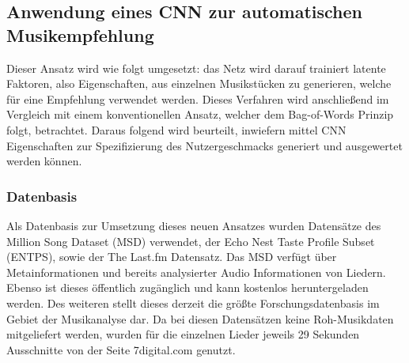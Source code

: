 \documentclass[twosided,a4,10pt]{article}
\begin{document}
\begin{multicols}{2}
		\subsection{Anwendung eines CNN zur automatischen Musikempfehlung}
		Dieser Ansatz wird wie folgt umgesetzt: das Netz wird darauf trainiert latente Faktoren, also Eigenschaften, aus einzelnen Musikstücken zu generieren, welche für eine Empfehlung verwendet werden. Dieses Verfahren wird anschließend im Vergleich mit einem konventionellen Ansatz, welcher dem Bag-of-Words Prinzip folgt, betrachtet. Daraus folgend wird beurteilt, inwiefern mittel CNN Eigenschaften zur Spezifizierung des Nutzergeschmacks generiert und ausgewertet werden können.
		
		\subsubsection{Datenbasis}
		Als Datenbasis zur Umsetzung dieses neuen Ansatzes wurden Datensätze des Million Song Dataset (MSD) verwendet, der Echo Nest Taste Profile Subset (ENTPS), sowie der The Last.fm Datensatz. Das MSD verfügt über Metainformationen und bereits analysierter Audio Informationen von Liedern. Ebenso ist dieses öffentlich zugänglich und kann kostenlos heruntergeladen werden. Des weiteren stellt dieses derzeit die größte Forschungsdatenbasis im Gebiet der Musikanalyse dar. Da bei diesen Datensätzen keine Roh-Musikdaten mitgeliefert werden, wurden für die einzelnen Lieder jeweils 29 Sekunden Ausschnitte von der Seite 7digital.com genutzt.\cite{MillionSongDataset} \cite{oord}
		

\end{multicols}
\end{document}
